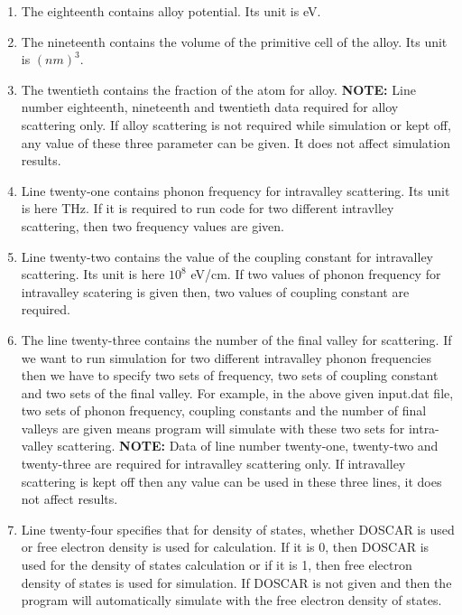 \documentclass[12pt]{article}
\begin{document}
\begin{enumerate}
\begin{enumerate}[label=\Roman*]
	
\item The eighteenth contains alloy potential. Its unit is eV. 

\item The nineteenth contains the volume of the primitive cell of the alloy. Its unit is $(nm)^3$. 

\item The twentieth contains the fraction of the atom for alloy. 
\newline \textbf{NOTE:} Line number eighteenth, nineteenth and twentieth data required for alloy scattering only. If alloy scattering is not required while simulation or kept off, any value of these three parameter can be given. It does not affect simulation results.
 
\item Line twenty-one contains phonon frequency for intravalley scattering. Its unit is here THz. If it is required to run code for two different intravlley scattering, then two frequency values are given.  

\item Line twenty-two contains  the value of the coupling constant for intravalley scattering. Its unit is here $10^8$ eV/cm. If two values of phonon frequency for intravalley scatering is given then, two values of coupling constant are required. 

\item The line twenty-three contains the number of the final valley for scattering. 
If we want to run simulation for two different intravalley phonon frequencies then we have to specify two sets of frequency, two sets of coupling constant and two sets of the final valley.
\newline For example, in the above given input.dat file, two sets of phonon frequency, coupling constants and the number of final valleys are given means program will simulate with these two sets for intra-valley scattering.   
\newline \textbf{NOTE:} Data of line number twenty-one, twenty-two and twenty-three are required for intravalley scattering only. If intravalley scattering is kept off then any value can be used in these three lines, it does not affect results. 

\item Line twenty-four specifies that for density of states, whether DOSCAR is used or free electron density is used for calculation. If it is 0, then DOSCAR is used for the density of states calculation or if it is 1, then free electron density of states is used for simulation. If DOSCAR is not given and then the program will automatically simulate with the free electron density of states.


\end{enumerate}
\end{enumerate}
\end{document}
